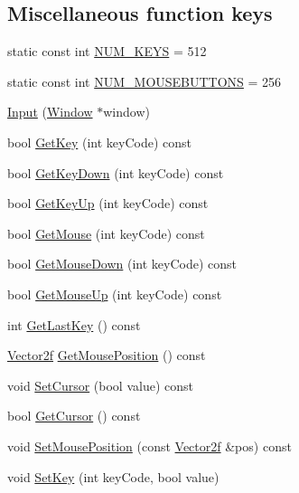 \subsection*{Miscellaneous function keys}
\begin{DoxyCompactItemize}
\item 
static const int \hyperlink{class_input_a593c9d5b6ca0df098a61b683b0b7bbce}{N\+U\+M\+\_\+\+K\+E\+Y\+S} = 512
\item 
static const int \hyperlink{class_input_aedaace4ea220bcd41963cf171c102288}{N\+U\+M\+\_\+\+M\+O\+U\+S\+E\+B\+U\+T\+T\+O\+N\+S} = 256
\item 
\hyperlink{class_input_a4f44bbd5cf0bea669dd96465cea32fd9}{Input} (\hyperlink{class_window}{Window} $\ast$window)
\item 
bool \hyperlink{class_input_a3115aad44cc2c783b6580e2e1b99e177}{Get\+Key} (int key\+Code) const 
\item 
bool \hyperlink{class_input_ae7c15e4925e775540acd3598f69c7784}{Get\+Key\+Down} (int key\+Code) const 
\item 
bool \hyperlink{class_input_a0c28431b0f0b7f7e322c1947f6e10b7b}{Get\+Key\+Up} (int key\+Code) const 
\item 
bool \hyperlink{class_input_a794df32c5c08c7c1e7b345e8ec1ce71a}{Get\+Mouse} (int key\+Code) const 
\item 
bool \hyperlink{class_input_ae8b2a58735d6e51b59373c2cab509bd3}{Get\+Mouse\+Down} (int key\+Code) const 
\item 
bool \hyperlink{class_input_af8f8625bda46222dbf147a59bc57c0e2}{Get\+Mouse\+Up} (int key\+Code) const 
\item 
int \hyperlink{class_input_a819ef218d61c49adb6ecd4ae80038894}{Get\+Last\+Key} () const 
\item 
\hyperlink{math3d_8h_a9f3739462b0605dcb64299fa289b6afe}{Vector2f} \hyperlink{class_input_a13d0d0ab7fdf79cc53da7cc7b996cdbe}{Get\+Mouse\+Position} () const 
\item 
void \hyperlink{class_input_aafef2f13da2c62be8bb7c647a5e4ffee}{Set\+Cursor} (bool value) const 
\item 
bool \hyperlink{class_input_a450bf444fb7fd6d7174b77e21d377f2c}{Get\+Cursor} () const 
\item 
void \hyperlink{class_input_a99e51c7d64f94650e9d0b551aa751662}{Set\+Mouse\+Position} (const \hyperlink{math3d_8h_a9f3739462b0605dcb64299fa289b6afe}{Vector2f} \&pos) const 
\item 
void \hyperlink{class_input_a0f6924f37ba551d6abb2529f5dfc964e}{Set\+Key} (int key\+Code, bool value)

\end{DoxyCompactItemize}
